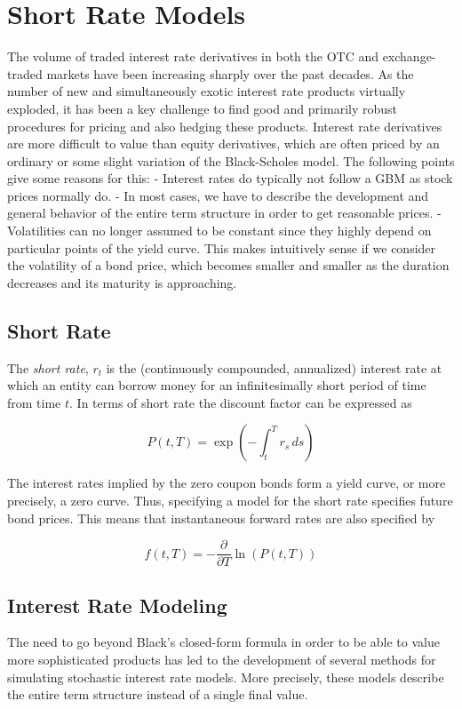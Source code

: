 \chapter{Short Rate Models}

The volume of traded interest rate derivatives in both the OTC and exchange-traded 
markets have been increasing sharply over the past decades. As the number of new 
and simultaneously exotic interest rate products virtually exploded, 
it has been a key challenge to find good and primarily robust procedures for 
pricing and also hedging these products. Interest rate derivatives are more 
difficult to value than equity derivatives, which are often priced by an ordinary 
or some slight variation of the Black-Scholes model. 
The following points give some reasons for this:
- Interest rates do typically not follow a GBM as stock prices normally do.
- In most cases, we have to describe the development and general behavior of the entire term structure in order to get reasonable prices.
- Volatilities can no longer assumed to be constant since they highly depend on particular points of the yield curve. This makes intuitively sense if we consider the volatility of a bond price, which becomes smaller and smaller as the duration decreases and its maturity is approaching.


\section{Short Rate}
The \emph{short rate}, $r_{t}$ is the (continuously compounded, annualized)
interest rate at which an entity can borrow money for an infinitesimally short
period of time from time $t$. In terms of short rate the discount factor 
can be expressed as

\begin{equation}
P(t,T)=\exp{\left(-\int _{t}^{T}r_{s}\,ds\right)}
\end{equation}

The interest rates implied by the zero coupon bonds form a yield curve, 
or more precisely, a zero curve. Thus, specifying a model for the short rate
specifies future bond prices. This means that instantaneous forward rates are
also specified by

\begin{equation}
f(t,T) =-\frac {\partial }{\partial T}\ln(P(t,T)) 
\end{equation}

\section{Interest Rate Modeling}
The need to go beyond Black’s closed-form formula in order to be able to 
value more sophisticated products has led to the development of several 
methods for simulating stochastic
interest rate models. More precisely, these models describe the entire 
term structure instead of a single final value. 

